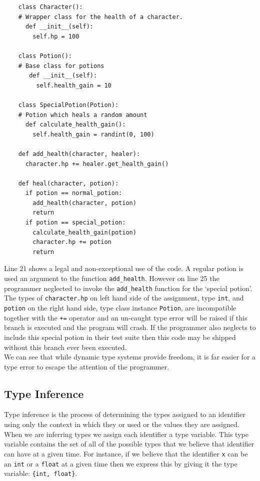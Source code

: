 \documentclass[12pt, titlepage]{article}
\begin{document}
\begin{lstlisting}
    class Character():
    # Wrapper class for the health of a character.
      def __init__(self):
        self.hp = 100
        
    class Potion():
    # Base class for potions
       def __init__(self):
         self.health_gain = 10
    
    class SpecialPotion(Potion):
    # Potion which heals a random amount
      def calculate_health_gain():
        self.health_gain = randint(0, 100)

    def add_health(character, healer):
      character.hp += healer.get_health_gain()

    def heal(character, potion):
      if potion == normal_potion:
        add_health(character, potion)
        return
      if potion == special_potion:
        calculate_health_gain(potion)
        character.hp += potion		
        return
\end{lstlisting}
Line 21 shows a legal and non-exceptional use of the code. A regular potion is used an argument to the function \texttt{add\_health}. However on line 25 the programmer neglected to invoke the \texttt{add\_health} function for the `special potion'. The types of \texttt{character.hp} on left hand side of the assignment, type \texttt{int}, and \texttt{potion} on the right hand side, type class instance \texttt{Potion}, are incompatible together with the \texttt{+=} operator and an un-caught type error will be raised if this branch is executed and the program will crash. If the programmer also neglects to include this special potion in their test suite then this code may be shipped without this branch ever been executed. \\
\indent We can see that while dynamic type systems provide freedom, it is far easier for a type error to escape the attention of the programmer.

\subsection{Type Inference}
Type inference is the process of determining the types assigned to an identifier using only the context in which they or used or the values they are assigned. When we are inferring types we assign each identifier a type variable. This type variable contains the set of all of the possible types that we believe that identifier can have at a given time. For instance, if we believe that the identifier \texttt{x} can be an \texttt{int} or a \texttt{float} at a given time then we express this by giving it the type variable: \texttt{\{int, float\}}.
\end{document}
